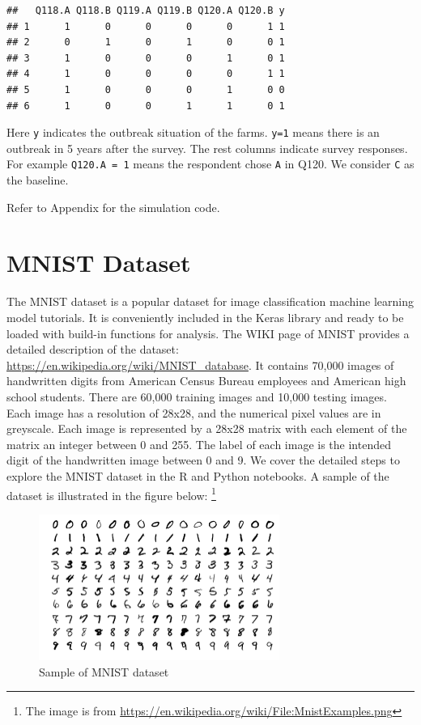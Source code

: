 \documentclass[
  12pt,
]{krantz}
\begin{document}
\begin{verbatim}
##   Q118.A Q118.B Q119.A Q119.B Q120.A Q120.B y
## 1      1      0      0      0      0      1 1
## 2      0      1      0      1      0      0 1
## 3      1      0      0      0      1      0 1
## 4      1      0      0      0      0      1 1
## 5      1      0      0      0      1      0 0
## 6      1      0      0      1      1      0 1
\end{verbatim}

Here \texttt{y} indicates the outbreak situation of the farms. \texttt{y=1} means there is an outbreak in 5 years after the survey. The rest columns indicate survey responses. For example \texttt{Q120.A\ =\ 1} means the respondent chose \texttt{A} in Q120. We consider \texttt{C} as the baseline.

Refer to Appendix for the simulation code.

\hypertarget{mnist-dataset}{%
\section{MNIST Dataset}\label{mnist-dataset}}

The MNIST dataset is a popular dataset for image classification machine learning model tutorials. It is conveniently included in the Keras library and ready to be loaded with build-in functions for analysis. The WIKI page of MNIST provides a detailed description of the dataset: \url{https://en.wikipedia.org/wiki/MNIST_database}. It contains 70,000 images of handwritten digits from American Census Bureau employees and American high school students. There are 60,000 training images and 10,000 testing images. Each image has a resolution of 28x28, and the numerical pixel values are in greyscale. Each image is represented by a 28x28 matrix with each element of the matrix an integer between 0 and 255. The label of each image is the intended digit of the handwritten image between 0 and 9. We cover the detailed steps to explore the MNIST dataset in the R and Python notebooks. A sample of the dataset is illustrated in the figure below: \footnote{The image is from \url{https://en.wikipedia.org/wiki/File:MnistExamples.png}}

\begin{figure}
\centering
\includegraphics[width=0.7\textwidth,height=\textheight]{images/MnistExamples.png}
\caption{Sample of MNIST dataset}
\end{figure}
\end{document}
